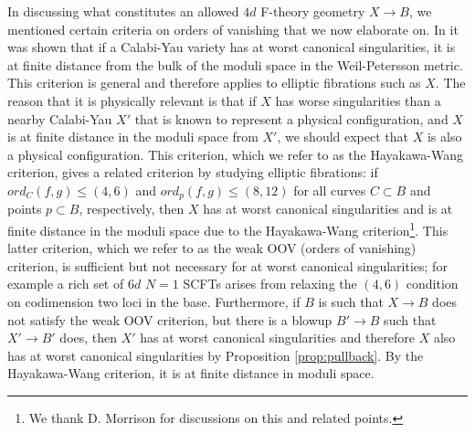 \documentclass[aps,prl,twocolumn, superscriptaddress,groupedaddress,nofootinbib]{revtex4-1}
\begin{document}
In discussing what constitutes an allowed $4d$ F-theory geometry $X\to B$, we mentioned
certain criteria on orders of vanishing that we now elaborate on. In 
\cite{Hayakawa,Wang} it was shown that if a Calabi-Yau variety has at worst
canonical singularities, it is at finite distance 
from the bulk of the moduli space in the Weil-Petersson metric. 
This criterion is general and therefore applies to elliptic fibrations such as $X$.
The reason that it is physically relevant is that if $X$ has worse singularities
than a nearby Calabi-Yau $X'$ that is known to represent a physical configuration,
and $X$ is at finite distance in the moduli space from $X'$, we should expect that
$X$ is also a physical configuration. This criterion, which we refer to as the
Hayakawa-Wang criterion, gives a related criterion by studying elliptic
fibrations:
if $ord_C(f,g)\leq(4,6)$ and $ord_p(f,g)\leq(8,12)$ 
for all curves $C\subset B$ and points $p\subset B$, respectively,
then  $X$ has at worst
canonical singularities and is at finite distance in the
moduli space due to the Hayakawa-Wang criterion\footnote{We thank D. Morrison for discussions on
this and related points.}. This latter criterion, which we refer to as the weak OOV (orders
of vanishing) criterion, is sufficient but not necessary for at worst canonical singularities; for example a rich set of $6d$ $N=1$
SCFTs \cite{Heckman:2013pva} arises from relaxing the $(4,6)$ condition on 
codimension two loci in the base. Furthermore, if $B$ is such that $X\to B$
does not satisfy the weak OOV criterion, but there is a blowup $B'\to B$ such
that $X'\to B'$ does, then $X'$ has at worst canonical singularities and therefore
$X$ also has at worst canonical singularities by 
Proposition \ref{prop:pullback}. By the Hayakawa-Wang criterion, it
is at finite distance in moduli space.
\end{document}
